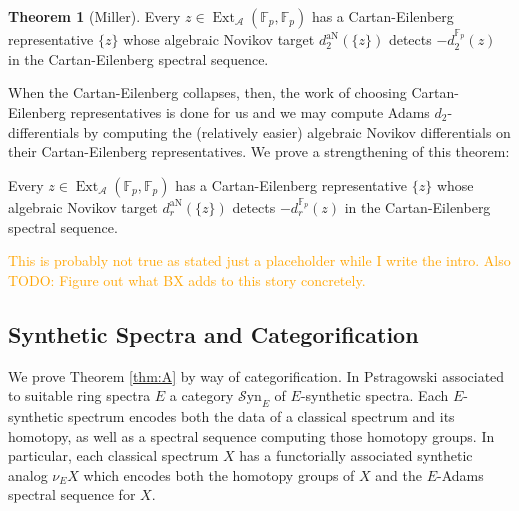 \documentclass[10pt]{amsart}
\theoremstyle{definition}
\numberwithin{figure}{section}
\numberwithin{equation}{section}
\newtheorem{theorem}[figure]{Theorem}
\newenvironment{manualtheorem}[1]{%
    \renewcommand\themanualtheoreminner{#1}%
  \manualtheoreminner
}{\endmanualtheoreminner}
\newcommand{\cA}{\mathcal{A}}
\newcommand{\Ext}{\operatorname{Ext}}
\theoremstyle{cited}
\newcommand{\bF}{\mathbb{F}}
\newcommand{\Syn}{\mathcal{S}\mathrm{yn}}
\begin{document}
\begin{theorem}[Miller]
  Every $z\in \Ext_{\cA}(\bF_p,\bF_p)$ has a Cartan-Eilenberg representative $\{z\}$ whose algebraic Novikov target $d_2^{\text{aN}}(\{z\})$ detects $-d^{\bF_p}_2(z)$ in the Cartan-Eilenberg spectral sequence.
\end{theorem}

When the Cartan-Eilenberg collapses, then, the work of choosing Cartan-Eilenberg representatives is done for us and we may compute Adams $d_2$-differentials by computing the (relatively easier) algebraic Novikov differentials on their Cartan-Eilenberg representatives. We prove a strengthening of this theorem:

\begin{manualtheorem}{A}
  \label{thm:A}
  Every $z\in \Ext_{\cA}(\bF_p,\bF_p)$ has a Cartan-Eilenberg representative $\{z\}$ whose algebraic Novikov target $d_r^{\text{aN}}(\{z\})$ detects $-d^{\bF_p}_r(z)$ in the Cartan-Eilenberg spectral sequence.
\end{manualtheorem}

\textcolor{orange}{This is probably not true as stated just a placeholder while I write the intro. Also TODO: Figure out what BX adds to this story concretely.}

\subsection{Synthetic Spectra and Categorification}

We prove Theorem \ref{thm:A} by way of categorification. In \cite{Pst22} Pstragowski associated to suitable ring spectra $E$ a category $\Syn_E$ of $E$-synthetic spectra. Each $E$-synthetic spectrum encodes both the data of a classical spectrum and its homotopy, as well as a spectral sequence computing those homotopy groups. In particular, each classical spectrum $X$ has a functorially associated synthetic analog $\nu_EX$ which encodes both the homotopy groups of $X$ and the $E$-Adams spectral sequence for $X$.
\end{document}
